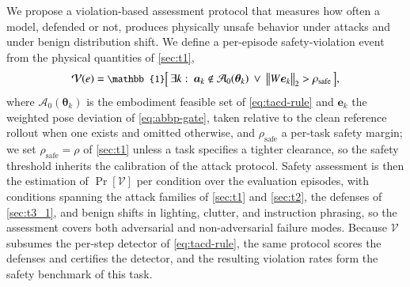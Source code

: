 \documentclass[11pt,letterpaper]{article}
\begin{document}
We propose a violation-based assessment protocol that measures how often a model, defended or not, produces physically unsafe behavior under attacks and under benign distribution shift.
We define a per-episode safety-violation event from the physical quantities of \autoref{sec:t1},
\vspace{-1.5ex}\begin{equation}
  \small
\mathcal{V}(e)=\mathbb{1}\Bigl[\,\exists k:\ \bm{a}_k\notin\mathcal{A}_0(\bm{\theta}_k)\ \lor\ \bigl\|W\bm{e}_k\bigr\|_{2}>\rho_{\mathrm{safe}}\,\Bigr],
\label{eq:safety-violation}
\vspace{-1.5ex}\end{equation}
where $\mathcal{A}_0(\bm{\theta}_k)$ is the embodiment feasible set of \autoref{eq:tacd-rule} and $\bm{e}_k$ the weighted pose deviation of \autoref{eq:abbp-gate}, taken relative to the clean reference rollout when one exists and omitted otherwise, and $\rho_{\mathrm{safe}}$ a per-task safety margin; we set $\rho_{\mathrm{safe}}{=}\rho$ of \autoref{sec:t1} unless a task specifies a tighter clearance, so the safety threshold inherits the calibration of the attack protocol. Safety assessment is then the estimation of $\Pr[\mathcal{V}]$ per condition over the evaluation episodes, with conditions spanning the attack families of \autoref{sec:t1} and \autoref{sec:t2}, the defenses of \autoref{sec:t3_1}, and benign shifts in lighting, clutter, and instruction phrasing, so the assessment covers both adversarial and non-adversarial failure modes. Because $\mathcal{V}$ subsumes the per-step detector of \autoref{eq:tacd-rule}, the same protocol scores the defenses and certifies the detector, and the resulting violation rates form the safety benchmark of this task.
\end{document}

